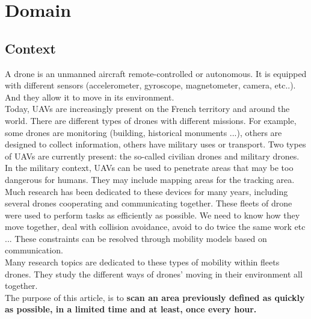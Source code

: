 \part{Domain}

\chapter{Context}

A drone is an unmanned aircraft remote-controlled or autonomous. It is equipped with different sensors (accelerometer, gyroscope, magnetometer, camera, etc..). And they allow it to move in its environment.\\

Today, UAVs are increasingly present on the French territory and around the world. There are different types of drones with different missions. For example, some drones are monitoring (building, historical monuments ...), others are designed to collect information, others have military uses or transport. Two types of UAVs are currently present: the so-called civilian drones and military drones. In the military context, UAVs can be used to penetrate areas that may be too dangerous for humans. They may include mapping areas for the tracking area.\\

Much research has been dedicated to these devices for many years, including several drones cooperating and communicating together. These fleets of drone were used to perform tasks as efficiently as possible. We need to know how they move together, deal with collision avoidance, avoid to do twice the same work etc ... These constraints can be resolved through mobility models based on communication.\\
Many research topics are dedicated to these types of mobility within fleets drones. They study the different ways of drones' moving in their environment all together.\\

The purpose of this article, is to \textbf{scan an area previously defined as quickly as possible, in a limited time and at least, once every hour.}